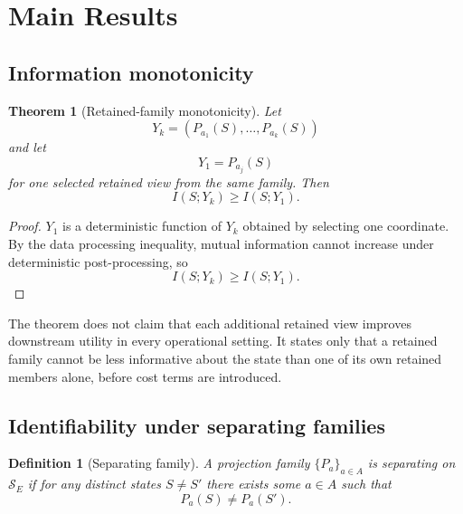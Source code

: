\documentclass[11pt,a4paper]{article}
\newtheorem{definition}{Definition}
\newtheorem{theorem}{Theorem}
\begin{document}
\section{Main Results}
\label{sec:results}

\subsection{Information monotonicity}

\begin{theorem}[Retained-family monotonicity]
\label{thm:monotonicity}
Let
\begin{equation}
Y_k = (P_{a_1}(S), \ldots, P_{a_k}(S))
\end{equation}
and let
\begin{equation}
Y_1 = P_{a_j}(S)
\end{equation}
for one selected retained view from the same family. Then
\begin{equation}
I(S;Y_k) \geq I(S;Y_1).
\end{equation}
\end{theorem}

\begin{proof}
$Y_1$ is a deterministic function of $Y_k$ obtained by selecting one coordinate. By the data processing inequality, mutual information cannot increase under deterministic post-processing, so
\begin{equation}
I(S;Y_k) \geq I(S;Y_1).
\end{equation}
\end{proof}

The theorem does not claim that each additional retained view improves downstream utility in every operational setting. It states only that a retained family cannot be less informative about the state than one of its own retained members alone, before cost terms are introduced.

\subsection{Identifiability under separating families}
\label{sec:ident}

\begin{definition}[Separating family]
A projection family $\{P_a\}_{a \in A}$ is separating on $\mathcal{S}_E$ if for any distinct states $S \neq S'$ there exists some $a \in A$ such that
\begin{equation}
P_a(S) \neq P_a(S').
\end{equation}
\end{definition}
\end{document}

